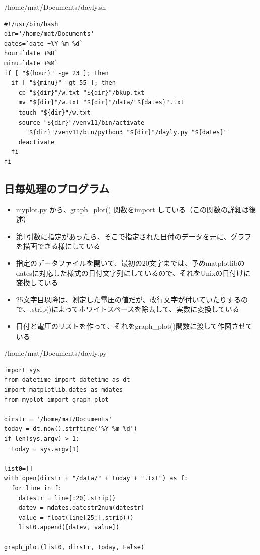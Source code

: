\documentclass[12pt,a4paper,uplatex]{jsarticle}
\begin{document}
\begin{itembox}[l]{/home/mat/Documents/dayly.sh}
	\begin{verbatim}
#!/usr/bin/bash
dir='/home/mat/Documents'
dates=`date +%Y-%m-%d`
hour=`date +%H`
minu=`date +%M`
if [ "${hour}" -ge 23 ]; then
  if [ "${minu}" -gt 55 ]; then
    cp "${dir}"/w.txt "${dir}"/bkup.txt
    mv "${dir}"/w.txt "${dir}"/data/"${dates}".txt
    touch "${dir}"/w.txt
    source "${dir}"/venv11/bin/activate
      "${dir}"/venv11/bin/python3 "${dir}"/dayly.py "${dates}"
    deactivate
  fi
fi
	\end{verbatim}
\end{itembox}


\subsection{日毎処理のプログラム}

\begin{itemize}
	\item myplot.py から、graph\_plot() 関数をimport している（この関数の詳細は後述）
	\item 第1引数に指定があったら、そこで指定された日付のデータを元に、グラフを描画できる様にしている
	\item 指定のデータファイルを開いて、最初の20文字までは、予めmatplotlibのdatesに対応した様式の日付文字列にしているので、それをUnixの日付けに変換している
	\item 25文字目以降は、測定した電圧の値だが、改行文字が付いていたりするので、.strip()によってホワイトスペースを除去して、実数に変換している
	\item 日付と電圧のリストを作って、それをgraph\_plot()関数に渡して作図させている
\end{itemize}

\begin{itembox}[l]{/home/mat/Documents/dayly.py}
	\begin{verbatim}
import sys
from datetime import datetime as dt
import matplotlib.dates as mdates
from myplot import graph_plot

dirstr = '/home/mat/Documents'
today = dt.now().strftime('%Y-%m-%d')
if len(sys.argv) > 1:
  today = sys.argv[1]

list0=[]
with open(dirstr + "/data/" + today + ".txt") as f:
  for line in f:
    datestr = line[:20].strip()
    datev = mdates.datestr2num(datestr)
    value = float(line[25:].strip())
    list0.append([datev, value])

graph_plot(list0, dirstr, today, False)
	\end{verbatim}
\end{itembox}
\end{document}
